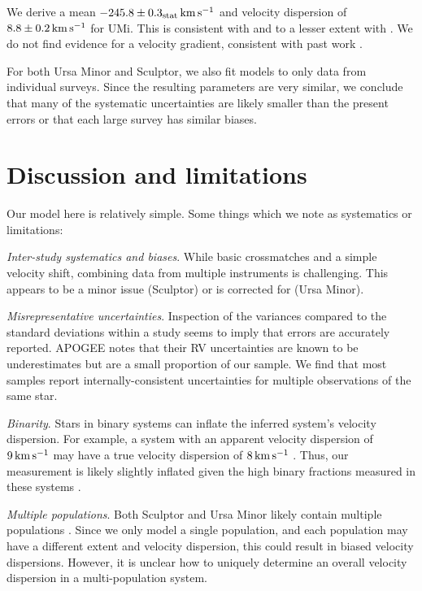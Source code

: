 We derive a mean \(-245.8\pm0.3_{\rm stat}\,{\rm km\,s^{-1}}\) and velocity
dispersion of \(8.8\pm0.2\,{\rm km\,s^{-1}}\) for UMi. This is consistent with
\citet{pace+2020} and to a lesser extent with \citet{spencer+2018}. We
do not find evidence for a velocity gradient, consistent with past work
\citep{pace+2020, martinez-garcia+2023}.

For both Ursa Minor and Sculptor, we also fit models to only data from
individual surveys. Since the resulting parameters are very similar, we
conclude that many of the systematic uncertainties are likely smaller
than the present errors or that each large survey has similar biases.

\section{Discussion and limitations}\label{discussion-and-limitations}

Our model here is relatively simple. Some things which we note as
systematics or limitations:

\emph{Inter-study systematics and biases}. While basic crossmatches and
a simple velocity shift, combining data from multiple instruments is
challenging. This appears to be a minor issue (Sculptor) or is corrected
for (Ursa Minor).

\emph{Misrepresentative uncertainties}. Inspection of the variances
compared to the standard deviations within a study seems to imply that
errors are accurately reported. APOGEE notes that their RV uncertainties
are known to be underestimates but are a small proportion of our sample.
We find that most samples report internally-consistent uncertainties for
multiple observations of the same star.

\emph{Binarity}. Stars in binary systems can inflate the inferred
system's velocity dispersion. For example, a system with an apparent
velocity dispersion of \(9\,{\rm km\,s^{-1}}\) may have a true velocity dispersion
of \(8\,{\rm km\,s^{-1}}\) \citep{spencer+2017}. Thus, our measurement is likely
slightly inflated given the high binary fractions measured in these
systems \citep{spencer+2018, arroyo-polonio+2023, gration+2025}.

\emph{Multiple populations}. Both Sculptor and Ursa Minor likely contain
multiple populations \citep[\citet{pace+2020},
\citet{tolstoy+2004}]{arroyo-polonio+2024}. Since we only model a single
population, and each population may have a different extent and velocity
dispersion, this could result in biased velocity dispersions. However,
it is unclear how to uniquely determine an overall velocity dispersion
in a multi-population system.

